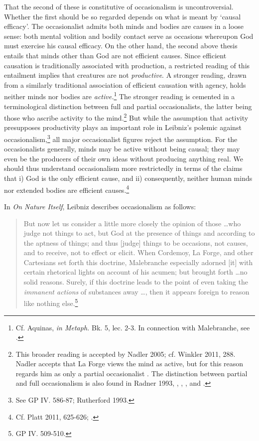 \documentclass{article}
\begin{document}
That the second of these is constitutive of occasionalism is
uncontroversial. Whether the first should be so regarded depends on what
is meant by `causal efficacy'. The occasionalist admits both minds and
bodies are causes in a loose sense: both mental volition and bodily
contact serve as occasions whereupon God must exercise his causal
efficacy. On the other hand, the second above thesis entails that minds
other than God are not efficient causes. Since efficient causation is
traditionally associated with production, a restricted reading of this
entailment implies that creatures are not \emph{productive}. A stronger
reading, drawn from a similarly traditional association of efficient
causation with agency, holds neither minds nor bodies are
\emph{active.}\footnote{Cf. Aquinas, \emph{in Metaph.} Bk. 5, lec. 2-3.
  In connection with Malebranche, see \autocite[255-256]{Baker2005}.} The stronger
reading is cemented in a terminological distinction between full and
partial occasionalists, the latter being those who ascribe activity to
the mind.\footnote{This broader reading is accepted by Nadler 2005; cf.
  Winkler 2011, 288. Nadler accepts that La Forge views the mind as
  active, but for this reason regards him as only a partial
  occasionalist \autocite[227]{Nadler1998}. The distinction between partial and
  full occasionalism is also found in Radner 1993, \autocite{Garber1987}, \autocite{Clarke2000}, \autocite{Bardout2002}, and \autocite{Kolesnik2006}.} But while the
assumption that activity presupposes productivity plays an important
role in Leibniz's polemic against occasionalism,\footnote{See GP IV.
  586-87; Rutherford 1993.} all major occasionalist figures reject the
assumption. For the occasionalists generally, minds may be active
without being causal; they may even be the producers of their own ideas
without producing anything real. We should thus understand occasionalism
more restrictedly in terms of the claims that i) God is the only
efficient cause, and ii) consequently, neither human minds nor extended
bodies are efficient causes.\footnote{Cf. Platt 2011, 625-626; \autocite[101]{Gouhier1926}.}

In \emph{On Nature Itself}, Leibniz describes occasionalism as follows:

\begin{quote}
But now let us consider a little more closely the opinion of those
\ldots who judge not things to act, but God at the presence of
things and according to the aptness of things; and thus {[}judge{]}
things to be occasions, not causes, and to receive, not to effect or
elicit. When Cordemoy, La Forge, and other Cartesians set forth this
doctrine, Malebranche especially adorned {[}it{]} with certain
rhetorical lights on account of his acumen; but brought forth
\ldots no solid reasons. Surely, if this doctrine leads to the
point of even taking the \emph{immanent actions} of substances away
\ldots, then it appears foreign to reason like nothing
else.\footnote{GP IV. 509-510.}
\end{quote}
\end{document}
